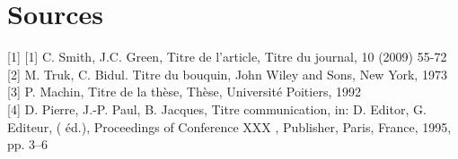 \documentclass{article}
\begin{document}
\section*{Sources}

\noindent
{[}1]
{[}1] C. Smith, J.C. Green, Titre de l’article, Titre du journal, 10 (2009) 55-72\\
{[}2] M. Truk, C. Bidul. Titre du bouquin, John Wiley and Sons, New York, 1973\\
{[}3] P. Machin, Titre de la thèse, Thèse, Université Poitiers, 1992\\
{[}4] D. Pierre, J.-P. Paul, B. Jacques, Titre communication, in: D. Editor, G. Editeur, ( éd.), Proceedings of Conference XXX , Publisher, Paris, France, 1995, pp. 3–6

\newpage
\end{document}
